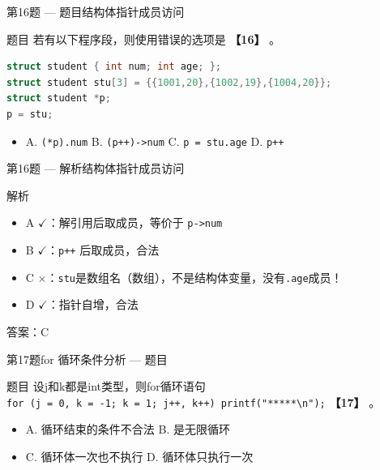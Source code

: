 \begin{frame}[fragile]{第16题 --- 题目}{结构体指针成员访问}
    \begin{exampleblock}{题目}
        若有以下程序段，则使用错误的选项是 \textbf{【16】} 。
    \end{exampleblock}
    \begin{lstlisting}[language=C, basicstyle=\footnotesize\ttfamily]
struct student { int num; int age; };
struct student stu[3] = {{1001,20},{1002,19},{1004,20}};
struct student *p;
p = stu;
\end{lstlisting}
    \begin{itemize}
        \item A. \texttt{(*p).num} \quad B. \texttt{(p++)->num} \quad C. \texttt{p = stu.age} \quad D. \texttt{p++}
    \end{itemize}
\end{frame}

\begin{frame}{第16题 --- 解析}{结构体指针成员访问}
    \small
    \begin{alertblock}{解析}
        \begin{itemize}
            \item A $\checkmark$：解引用后取成员，等价于 \texttt{p->num}
            \item B $\checkmark$：\texttt{p++} 后取成员，合法
            \item {\color{highlight}C $\times$：\texttt{stu}是数组名（数组），不是结构体变量，没有\texttt{.age}成员！}
            \item D $\checkmark$：指针自增，合法
        \end{itemize}
        {\color{highlight}答案：C}
    \end{alertblock}
\end{frame}

\begin{frame}{第17题}{for 循环条件分析 --- 题目}
    \begin{exampleblock}{题目}
        \small 设j和k都是int类型，则for循环语句\\
        \texttt{for (j = 0, k = -1; k = 1; j++, k++) printf("*****\textbackslash n");} \textbf{【17】} 。
        \begin{itemize}
            \setlength{\itemsep}{0pt}
            \item A. 循环结束的条件不合法 \quad B. 是无限循环
            \item C. 循环体一次也不执行 \quad D. 循环体只执行一次
        \end{itemize}
    \end{exampleblock}
\end{frame}

